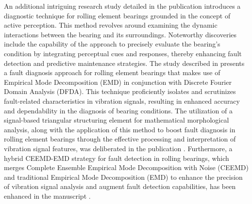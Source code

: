 \documentclass[sn-basic,pdflatex]{sn-jnl}
\theoremstyle{remark}
\theoremstyle{definition}
\begin{document}
An additional intriguing research study detailed in the publication
\citep{WOS:000360994300029} introduces a diagnostic technique for
rolling element bearings grounded in the concept of active perception.
This method revolves around examining the dynamic interactions between
the bearing and its surroundings. Noteworthy discoveries include the
capability of the approach to precisely evaluate the bearing's condition
by integrating perceptual cues and responses, thereby enhancing fault
detection and predictive maintenance strategies. The study described in
\citep{WOS:000343577703075} presents a fault diagnosis approach for
rolling element bearings that makes use of Empirical Mode Decomposition
(EMD) in conjunction with Discrete Fourier Domain Analysis (DFDA). This
technique proficiently isolates and scrutinizes fault-related
characteristics in vibration signals, resulting in enhanced accuracy and
dependability in the diagnosis of bearing conditions. The utilization of
a signal-based triangular structuring element for mathematical
morphological analysis, along with the application of this method to
boost fault diagnosis in rolling element bearings through the effective
processing and interpretation of vibration signal features, was
deliberated in the publication \citep{WOS:000334316700001}. Furthermore,
a hybrid CEEMD-EMD strategy for fault detection in rolling bearings,
which merges Complete Ensemble Empirical Mode Decomposition with Noise
(CEEMD) and traditional Empirical Mode Decomposition (EMD) to enhance
the precision of vibration signal analysis and augment fault detection
capabilities, has been enhanced in the manuscript
\citep{WOS:000412752200052}.
\end{document}
